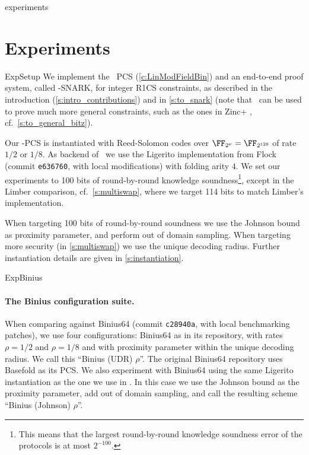 \begin{lncsappendix}{experiments}
\iflncs\else\section{Experiments} \label{s:experiments}\fi %

\begin{lncsmove}{ExpSetup}
We implement the \ftwoz\ PCS (\cref{c:LinModFieldBin}) and an end-to-end proof system, called \ftwoz-SNARK, for integer R1CS constraints, as described in the introduction (\cref{s:intro_contributions}) and in \cref{s:to_snark} (note that \ftwoz \ can be used to prove much more general constraints, such as the ones in Zinc+ \cite{zincplus}, cf.\ \cref{s:to_general_bitz}). 






Our \ftwoz-PCS is instantiated with Reed-Solomon codes over $\comfield=\FF_{2^{128}}$ of rate $1/2$ or $1/8$. As  backend of \ftwoz \ we use the Ligerito implementation from Flock \cite{flock} (commit \texttt{e636760}, with local modifications) with folding arity $4$. We set our experiments to 100 bits of round-by-round knowledge soundness\footnote{This means  that the largest round-by-round knowledge soundness error of the protocols is at most $2^{-100}$.}, except in the Limber \cite{limber} comparison, cf.\  \cref{s:multiswap}, where we target 114 bits to match Limber's implementation. %

When targeting 100 bits of round-by-round soundness we use the Johnson bound as proximity parameter, and perform out of domain sampling. When targeting more security (in \cref{s:multiswap}) we use the unique decoding radius. Further instantiation details are given in \cref{s:instantiation}.






\end{lncsmove}

\begin{lncsmove}{ExpBinius}
\iflncs\else\paragraph{The Binius configuration suite.}\fi\label{s:binius_suite} When  comparing against Binius64 (commit \texttt{c28940a}, with local benchmarking patches), we use four configurations: Binius64 as in its repository, with rates $\rho=1/2$ and $\rho=1/8$ and with proximity parameter within the unique decoding radius. We call this ``Binius (UDR) $\rho$''. The original Binius64 repository uses Basefold \cite{basefold} as its PCS. We also experiment with Binius64 using the same Ligerito instantiation as the one we use in \ftwoz. In this case we use the Johnson bound as the proximity parameter, add out of domain sampling, and call the resulting scheme  ``Binius (Johnson) $\rho$''.


\end{lncsmove}
\end{lncsappendix}
